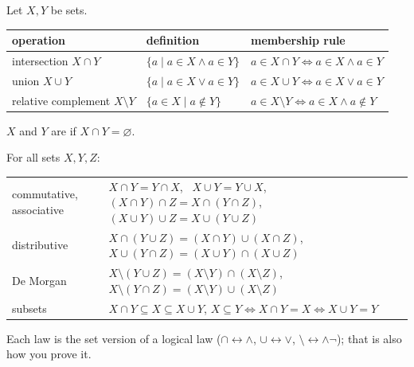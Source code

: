 \begin{key}
Let $X,Y$ be sets.
\begin{center}\small
\begin{tabular}{@{}l l l@{}}
\toprule
operation & definition & membership rule\\
\midrule
intersection $X\cap Y$ & $\{a\mid a\in X\wedge a\in Y\}$ & $a\in X\cap Y\Leftrightarrow a\in X\wedge a\in Y$\\
union $X\cup Y$ & $\{a\mid a\in X\vee a\in Y\}$ & $a\in X\cup Y\Leftrightarrow a\in X\vee a\in Y$\\
relative complement $X\setminus Y$ & $\{a\in X\mid a\notin Y\}$ & $a\in X\setminus Y\Leftrightarrow a\in X\wedge a\notin Y$\\
\bottomrule
\end{tabular}
\end{center}
$X$ and $Y$ are  if $X\cap Y=\varnothing$.
\begin{center}
\end{center}
\end{key}

\begin{result}
For all sets $X,Y,Z$:
\begin{center}\small
\begin{tabular}{@{}l l@{}}
\toprule
commutative, associative & $X\cap Y=Y\cap X$, \ $X\cup Y=Y\cup X$, \ $(X\cap Y)\cap Z=X\cap(Y\cap Z)$, \ $(X\cup Y)\cup Z=X\cup(Y\cup Z)$\\
distributive & $X\cap(Y\cup Z)=(X\cap Y)\cup(X\cap Z)$, \quad $X\cup(Y\cap Z)=(X\cup Y)\cap(X\cup Z)$\\
De Morgan & $X\setminus(Y\cup Z)=(X\setminus Y)\cap(X\setminus Z)$, \quad $X\setminus(Y\cap Z)=(X\setminus Y)\cup(X\setminus Z)$\\
subsets & $X\cap Y\subseteq X\subseteq X\cup Y$, \quad $X\subseteq Y\Leftrightarrow X\cap Y=X\Leftrightarrow X\cup Y=Y$\\
\bottomrule
\end{tabular}
\end{center}
Each law is the set version of a logical law ($\cap\leftrightarrow\wedge$, $\cup\leftrightarrow\vee$, $\setminus\leftrightarrow\wedge\neg$); that is also how you prove it.
\end{result}

